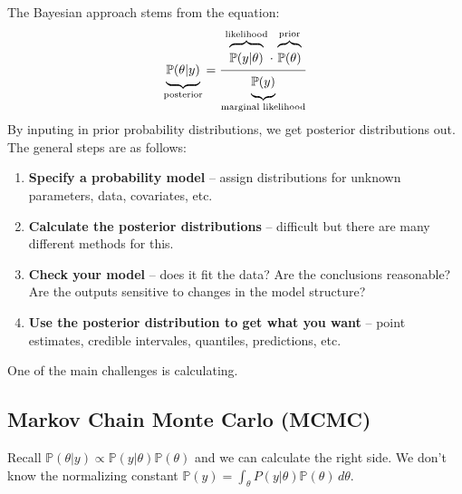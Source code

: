 \documentclass[12pt]{article}
\newcommand{\mystrut}{\ensuremath{\vphantom{\sum}}}
\newcommand{\PP}{\ensuremath{\mathbb{P}}}
\begin{document}
The Bayesian approach stems from the equation:
\begin{align*}
  \underbrace{\mystrut\PP(\theta|y)}_{\text{posterior}} =
  \frac{\overbrace{\mystrut\PP(y|\theta)}^{\text{likelihood}}\cdot\,\overbrace{\mystrut\PP(\theta)}^{\text{prior}}}
  {\underbrace{\mystrut\PP(y)}_{\text{marginal likelihood}}}
\end{align*}
By inputing in prior probability distributions, we get posterior distributions
out. The general steps are as follows:
\begin{enumerate}
\item {\bf Specify a probability model} -- assign distributions for unknown parameters,
  data, covariates, etc.
\item {\bf Calculate the posterior distributions} -- difficult but there are many
  different methods for this.
\item {\bf Check your model} -- does it fit the data? Are the conclusions reasonable? Are the outputs sensitive to changes in the model structure?
\item {\bf Use the posterior distribution to get what you want} -- point estimates,
  credible intervales, quantiles, predictions, etc.
\end{enumerate}

One of the main challenges is calculating.

\subsection{Markov Chain Monte Carlo (MCMC)}


Recall $\PP(\theta|y) \propto \PP(y|\theta) \PP(\theta)$ and we can calculate the
right side. We don't know the normalizing constant $\PP(y) = \int_\theta P(y|\theta)
\PP(\theta) \, d\theta$.
\end{document}

